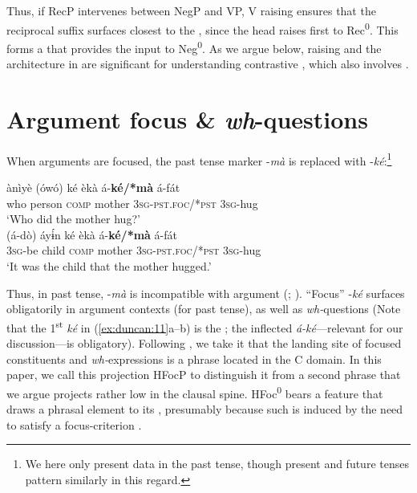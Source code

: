 \documentclass[output=paper,
modfonts
]{langscibook}
\begin{document}
Thus, if RecP intervenes between NegP and VP, V raising ensures that the reciprocal suffix surfaces closest to the , since the  head raises first to Rec\textsuperscript{0}. This forms a  that provides the input to Neg\textsuperscript{0}. As we argue below,  raising and the architecture in  are significant for understanding contrastive  , which also involves .

\section{Argument focus \& \textit{wh}-questions}     \label{sec:duncan:3}

When arguments are focused, the past tense marker -\textit{mà} is replaced with -\textit{ké}:\footnote{We here only present data in the past tense, though present and future tenses pattern similarly in this regard.}

\settowidth{}
\ea \label{ex:duncan:11}
\ea 
\gll ànìyè (ówó) ké èkà á-\textbf{ké/*mà} á-fát\\
 who person \textsc{comp} mother 3\textsc{sg-pst.foc/*pst} \textsc{3sg}-hug\\
\glt ‘Who did the mother hug?’\\

\ex
\gll (á-dò) áy\'ɨn ké èkà á-\textbf{ké/*mà} á-fát\\
 3\textsc{sg}-be child \textsc{comp} mother 3\textsc{sg-pst.foc/*pst} \textsc{3sg}-hug\\
\glt ‘It was the child that the mother hugged.’
\z
\z

Thus, in past tense, -\textit{mà} is incompatible with argument  (\citealt{Essien1990grammar,Essien1990aspect}; \citealt[244]{WillieUdoinyang2012}). “Focus” -\textit{ké} surfaces obligatorily in argument  contexts (for past tense), as well as \textit{wh-}questions (Note that the 1\textsuperscript{st} \textit{ké} in (\ref{ex:duncan:11}a--b) is the ; the inflected \textit{á-ké}---relevant for our discussion---is obligatory). Following \citet{Rizzi1997}, we take it that the landing site of focused constituents and \textit{wh-}expressions is a  phrase located in the C domain. In this paper, we call this projection HFocP to distinguish it from a second  phrase that we argue projects rather low in the clausal spine. HFoc\textsuperscript{0} bears a  feature that draws a phrasal element to its , presumably because such  is induced by the need to satisfy a focus-criterion \citep{Rizzi1997}.
\end{document}
